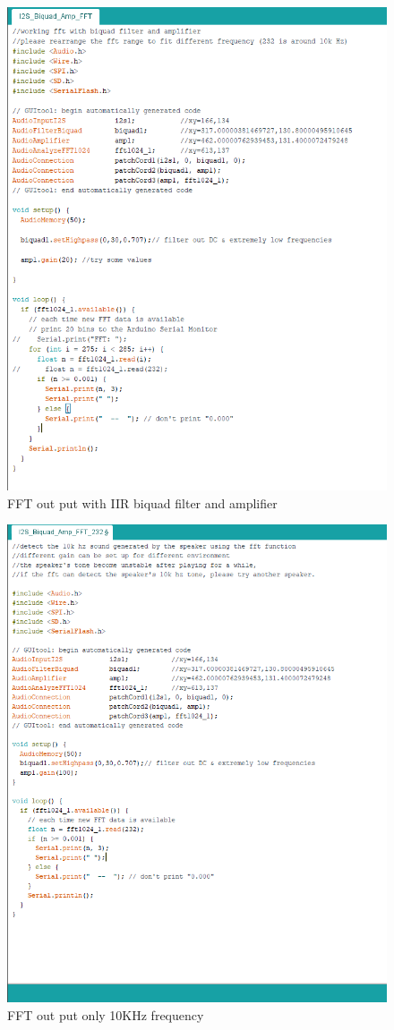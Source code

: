 \begin{figure}[H]
	\centering
	\noindent\includegraphics[width=1\textwidth]{images/I2S_Biquad_Amp_FFT.png}
	\caption{FFT out put with IIR biquad filter and amplifier}
	\label{fig:Biquad}
\end{figure}

\begin{figure}[H]
	\centering
	\noindent\includegraphics[width=1\textwidth]{images/10KHz.png}
	\caption{FFT out put only 10KHz frequency}
	\label{fig:10KHz}
\end{figure}

